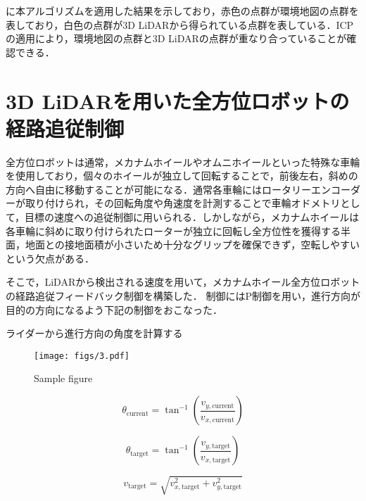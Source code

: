 \documentclass[a4jsme]{jsmepaper}
\begin{document}
に本アルゴリズムを適用した結果を示しており，赤色の点群が環境地図の点群を表しており，白色の点群が3D LiDARから得られている点群を表している．ICPの適用により，環境地図の点群と3D LiDARの点群が重なり合っていることが確認できる．

\section{3D LiDARを用いた全方位ロボットの経路追従制御}
全方位ロボットは通常，メカナムホイールやオムニホイールといった特殊な車輪を使用しており，個々のホイールが独立して回転することで，前後左右，斜めの方向へ自由に移動することが可能になる．通常各車輪にはロータリーエンコーダーが取り付けられ，その回転角度や角速度を計測することで車輪オドメトリとして，目標の速度への追従制御に用いられる．しかしながら，メカナムホイールは各車輪に斜めに取り付けられたローターが独立に回転し全方位性を獲得する半面，地面との接地面積が小さいため十分なグリップを確保できず，空転しやすいという欠点がある．

そこで，LiDARから検出される速度を用いて，メカナムホイール全方位ロボットの経路追従フィードバック制御を構築した．
制御にはP制御を用い，進行方向が目的の方向になるよう下記の制御をおこなった．

ライダーから進行方向の角度を計算する

\begin{figure}[htbp]
  \begin{center}
  \vspace{1zh}
    \texttt{[image: figs/3.pdf]}
  \end{center}
  \caption{Sample figure}
  \label{fig:fig3}
\end{figure}


\begin{equation}
   \theta_{\text{current}} = \tan^{-1} \left( \frac{v_{y,\text{current}}}{v_{x,\text{current}}} \right)
\label{eq:current_angle}
\end{equation}

\begin{equation}
   \theta_{\text{target}} = \tan^{-1} \left( \frac{v_{y,\text{target}}}{v_{x,\text{target}}} \right)
\label{eq:target_angle}
\end{equation}

\begin{equation}
   v_{\text{target}} = \sqrt{v_{x,\text{target}}^2 + v_{y,\text{target}}^2}
\label{eq:target_speed}
\end{equation}
\end{document}
